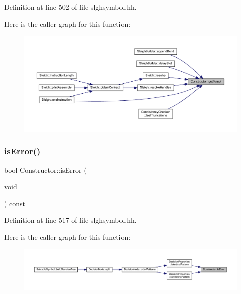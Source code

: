Definition at line 502 of file slghsymbol.\+hh.

Here is the caller graph for this function\+:
\nopagebreak
\begin{figure}[H]
\begin{center}
\leavevmode
\includegraphics[width=350pt]{class_constructor_a7688528dd1486806b75cac5a0c968d75_icgraph}
\end{center}
\end{figure}
\mbox{\label{class_constructor_a7328fb79671921ab3366f5bd7a685c1e}} 
\subsubsection{\texorpdfstring{isError()}{isError()}}
{\footnotesize\ttfamily bool Constructor\+::is\+Error (\begin{DoxyParamCaption}\item[{void}]{ }\end{DoxyParamCaption}) const\hspace{0.3cm}{\ttfamily [inline]}}



Definition at line 517 of file slghsymbol.\+hh.

Here is the caller graph for this function\+:
\nopagebreak
\begin{figure}[H]
\begin{center}
\leavevmode
\includegraphics[width=350pt]{class_constructor_a7328fb79671921ab3366f5bd7a685c1e_icgraph}
\end{center}
\end{figure}
\mbox{\label{class_constructor_a367658054735fbf9901f4af537efeb38}} 
